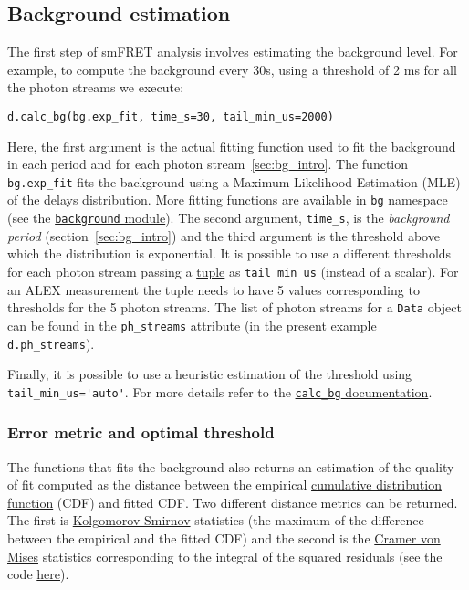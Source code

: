 \subsection{Background estimation}
\label{sec:bg_calc}

The first step of smFRET analysis involves estimating the background level. For example, to compute the background every 30s, using a threshold of 2 ms for all the photon streams we execute: 

\begin{verbatim}
d.calc_bg(bg.exp_fit, time_s=30, tail_min_us=2000)
\end{verbatim}

Here, the first argument is the actual fitting function used to fit the
background in each period and for each photon stream~\ref{sec:bg_intro}. The function 
\verb|bg.exp_fit| fits the background using a Maximum Likelihood Estimation 
(MLE) of the delays distribution. More fitting functions are available in 
\verb|bg| namespace (see the 
\href{http://fretbursts.readthedocs.org/en/latest/background.html}
{\texttt{background} module}). The second argument, \verb|time_s|, is the 
\textit{background period} (section~\ref{sec:bg_intro}) and the third argument is the threshold above which the distribution is exponential. 
It is possible to use a different thresholds 
for each photon stream passing a \href{https://docs.python.org/2/tutorial/datastructures.html#tuples-and-sequences}{tuple} as \verb|tail_min_us| (instead 
of a scalar). For an ALEX measurement the tuple needs to have 5 values 
corresponding to thresholds for the 5 photon streams. The list of photon 
streams for a \verb|Data| object can be found in the \verb|ph_streams| 
attribute (in the present example \verb|d.ph_streams|). 

Finally, it is 
possible to use a heuristic estimation of the threshold using 
\verb|tail_min_us='auto'|. For more details refer to the 
\href{http://fretbursts.readthedocs.org/en/latest/data_class.html#fretbursts.burstlib.Data.calc_bg}{\texttt{calc\_bg} documentation}.

\subsubsection{Error metric and optimal threshold}

The functions that fits the background also returns an estimation of the quality of fit computed as the distance between the empirical \href{http://en.wikipedia.org/wiki/Cumulative_distribution_function}{cumulative distribution function} (CDF) and fitted CDF. Two different distance metrics can be returned. The first is  
\href{http://en.wikipedia.org/wiki/Kolmogorov\%E2\%80\%93Smirnov_test}{Kolgomorov-Smirnov} statistics (the maximum of the difference between the empirical and the fitted CDF) and the second is the \href{http://en.wikipedia.org/wiki/Cram\%C3\%A9r\%E2\%80\%93von_Mises_criterion}{Cramer von Mises} statistics corresponding to the integral of the squared residuals (see the code \href{https://github.com/tritemio/FRETBursts/blob/master/fretbursts/background.py#L40}{here}).

